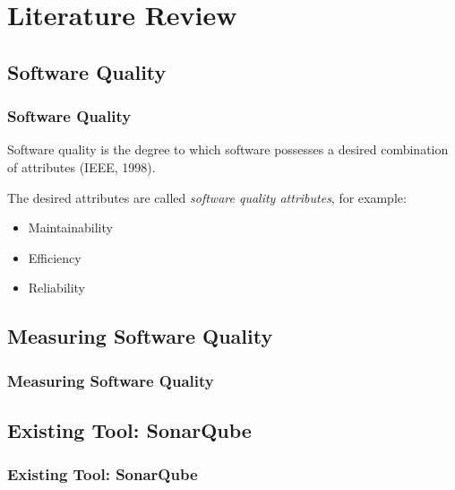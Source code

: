 \section{Literature Review}

\subsection{Software Quality}
\begin{frame}
\frametitle{Software Quality}

\begin{definition}
Software quality is the degree to which software possesses a desired combination of attributes (IEEE, 1998).
\end{definition} \pause

The desired attributes are called \emph{software quality attributes}, for example:
\begin{itemize}
  \item Maintainability
  \item Efficiency
  \item Reliability
\end{itemize}

\end{frame}

\subsection{Measuring Software Quality}
\begin{frame}
\frametitle{Measuring Software Quality}

\end{frame}

\subsection{Existing Tool: SonarQube}
\begin{frame}
\frametitle{Existing Tool: SonarQube}

\end{frame}